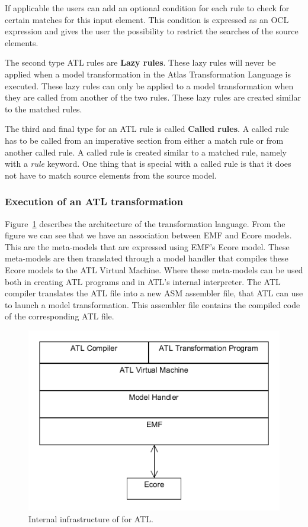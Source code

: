 If applicable the users can add an optional condition for each rule to check for
certain matches for this input element. This condition is expressed as an OCL
expression and gives the user the possibility to restrict the searches of the
source elements. 

The second type ATL rules are \textbf{Lazy rules}. These lazy rules will
never be applied when a model transformation in the Atlas Transformation
Language is executed. These lazy rules can only be applied to a model
transformation when they are called from another of the two rules. These lazy
rules are created similar to the matched rules.

The third and final type for an ATL rule is called \textbf{Called rules}. A
called rule has to be called from an imperative section from either a match rule or
from another called rule. A called rule is created similar to a matched rule,
namely with a \textit{rule} keyword. One thing that is special with a called
rule is that it does not have to match source elements from the source model.

\subsubsection*{Execution of an ATL transformation}

Figure~\ref{fig:ATL_Execution} describes the architecture of the transformation
language. From the figure we can see that we have an association between EMF and
Ecore models. This are the meta-models that are expressed using EMF's Ecore
model. These meta-models are then translated through a model handler that
compiles these Ecore models to the ATL Virtual Machine. Where these meta-models
can be used both in creating ATL programs and in ATL's internal interpreter. The
ATL compiler translates the ATL file into a new ASM assembler file, that ATL can
use to launch a model transformation. This assembler file contains the
compiled code of the corresponding ATL file.

\begin{figure}[H]
	\centering
	\includegraphics[scale=0.6]{figures/ATL_Execution.png}
	\caption[Internal infrastructure for ATL]
	{Internal infrastructure of for ATL.}
	\label{fig:ATL_Execution}
\end{figure}


